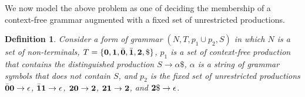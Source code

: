 \documentclass[9pt]{sigplanconf}
\newtheorem{definition}[theorem]{Definition}
\begin{document}
We now model the above problem  as one of deciding the membership of a
context-free  grammar  augmented  with  a fixed  set  of  unrestricted
productions.

\begin{definition}\label{def:specialgrammar}
Consider a form of  grammar $(N,T, p_1\cup p_2,S)$ in which $N$ is a set of
non-terminals, $T = \{\mathbf{0}, \mathbf{1}, \bar{\mathbf{0}}, \bar{\mathbf{1}}, {\mathbf{2}}, \$\}$, $p_1$
is a set of context-free production that contains the distinguished
production $S \rightarrow \alpha\$$, $\alpha$ is a string of grammar
symbols that does not contain $S$, and $p_2$ is the fixed set of
unrestricted productions $\bar{\mathbf{0}}\mathbf{0} \rightarrow \epsilon$,
$\bar{\mathbf{1}}\mathbf{1} \rightarrow \epsilon$, ${\mathbf{2}}\mathbf{0} \rightarrow {\mathbf{2}}$,
${\mathbf{2}}\mathbf{1} \rightarrow {\mathbf{2}}$, and ${\mathbf{2}}\$ \rightarrow
\epsilon$.
\end{definition}
\end{document}
